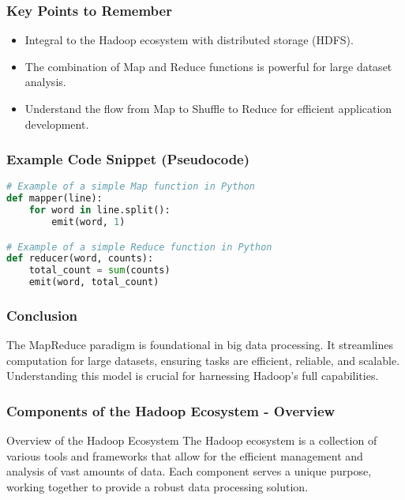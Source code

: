 \documentclass[aspectratio=169]{beamer}
\begin{document}
\begin{frame}[fragile]
    \frametitle{Key Points to Remember}
    \begin{itemize}
        \item Integral to the Hadoop ecosystem with distributed storage (HDFS).
        \item The combination of Map and Reduce functions is powerful for large dataset analysis.
        \item Understand the flow from Map to Shuffle to Reduce for efficient application development.
    \end{itemize}
\end{frame}

\begin{frame}[fragile]
    \frametitle{Example Code Snippet (Pseudocode)}
    \begin{lstlisting}[language=Python]
# Example of a simple Map function in Python
def mapper(line):
    for word in line.split():
        emit(word, 1)

# Example of a simple Reduce function in Python
def reducer(word, counts):
    total_count = sum(counts)
    emit(word, total_count)
    \end{lstlisting}
\end{frame}

\begin{frame}[fragile]
    \frametitle{Conclusion}
    The MapReduce paradigm is foundational in big data processing. 
    It streamlines computation for large datasets, ensuring tasks are efficient, reliable, and scalable. 
    Understanding this model is crucial for harnessing Hadoop's full capabilities.
\end{frame}

\begin{frame}[fragile]
    \frametitle{Components of the Hadoop Ecosystem - Overview}
    \begin{block}{Overview of the Hadoop Ecosystem}
        The Hadoop ecosystem is a collection of various tools and frameworks that allow for the efficient management and analysis of vast amounts of data. Each component serves a unique purpose, working together to provide a robust data processing solution.
    \end{block}
\end{frame}
\end{document}
